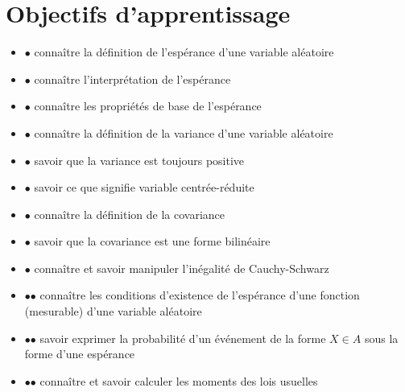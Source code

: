 \chapter{Objectifs d'apprentissage}\label{II-objectifs-dapprentissage}

\label{II-moments-dune-variable-aluxe9atoire}

\begin{itemize}
\tightlist
\item
  $\mathord{\bullet}$ connaître la définition de l'espérance d'une
  variable aléatoire
\item
  $\mathord{\bullet}$ connaître l'interprétation de l'espérance
\item
  $\mathord{\bullet}$ connaître les propriétés de base de l'espérance
\item
  $\mathord{\bullet}$ connaître la définition de la variance d'une
  variable aléatoire
\item
  $\mathord{\bullet}$ savoir que la variance est toujours positive
\item
  $\mathord{\bullet}$ savoir ce que signifie variable centrée-réduite
\item
  $\mathord{\bullet}$ connaître la définition de la covariance
\item
  $\mathord{\bullet}$ savoir que la covariance est une forme bilinéaire
\item
  $\mathord{\bullet}$ connaître et savoir manipuler l'inégalité de
  Cauchy-Schwarz
\item
  $\mathord{\bullet}\mathord{\bullet}$ connaître les conditions
  d'existence de l'espérance d'une fonction (mesurable) d'une variable
  aléatoire
\item
  $\mathord{\bullet}\mathord{\bullet}$ savoir exprimer la probabilité
  d'un événement de la forme \(X \in A\) sous la forme d'une espérance
\item
  $\mathord{\bullet}\mathord{\bullet}$ connaître et savoir calculer les
  moments des lois usuelles
\end{itemize}

\label{II-vecteurs-aluxe9atoires}

